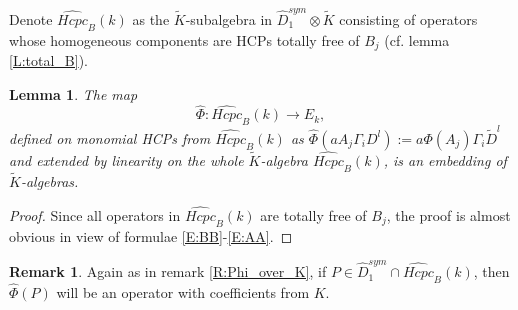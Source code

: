 \documentclass[11pt]{article}
\theoremstyle{definition}
\newtheorem{rem}{Remark}[section]
\theoremstyle{plain}
\newtheorem{lemma}{Lemma}[section]
\numberwithin{equation}{section}
\begin{document}
Denote $\widehat{Hcpc}_B(k)$ as the $\tilde{K}$-subalgebra in $\hat{D}_1^{sym}\hat{\otimes}\tilde{K}$ consisting of operators whose homogeneous components are HCPs totally free of $B_j$ (cf. lemma \ref{L:total_B}). 

\begin{lemma}
\label{L:embedding_Phi}
The map 
$$
\hat{\Phi}: \widehat{Hcpc}_B(k) \longrightarrow E_k,
$$
defined on monomial HCPs from $\widehat{Hcpc}_B(k)$ as $\hat{\Phi} (a A_j\Gamma_iD^l):=a \Phi (A_j)\Gamma_i\tilde{D}^l$ and extended by linearity on the whole $\tilde{K}$-algebra $\widehat{Hcpc}_B(k)$, is an embedding of $\tilde{K}$-algebras.
\end{lemma}

\begin{proof}
Since all operators in $\widehat{Hcpc}_B(k)$ are totally free of $B_j$, the proof is almost obvious in view of formulae \eqref{E:BB}-\eqref{E:AA}.
\end{proof}

\begin{rem}
\label{R:hatPhi_over_K}
Again as in remark \ref{R:Phi_over_K}, if $P\in \hat{D}_1^{sym}\cap \widehat{Hcpc}_B(k)$, then $\hat{\Phi} (P)$ will be an operator with coefficients from $K$. 
\end{rem}
\end{document}

